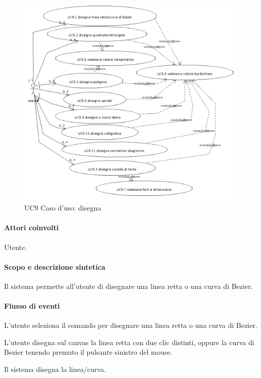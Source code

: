 \begin{figure}[!ht]
\centering
\vspace{20pt} 
\includegraphics{UC9Espanso}
\caption{UC9 Caso d'uso: disegna}
\label{uc9}
\end{figure}


\paragraph{Attori coinvolti} Utente.
\paragraph{Scopo e descrizione sintetica} 
Il sistema permette all'utente di disegnare una linea retta o una curva di Bezier.
\paragraph{Flusso di eventi}
\begin{elenconumerato}[\textbf{}]{\subsubsecindent}
\item L'utente seleziona il comando per disegnare una linea retta o una curva di Bezier.
\item L'utente disegna sul canvas la linea retta con due clic distinti, oppure la curva di Bezier tenendo premuto il pulsante sinistro del mouse.
\item Il sistema disegna la linea/curva.
\end{elenconumerato}
